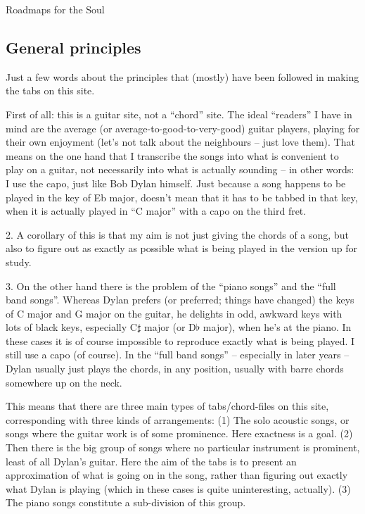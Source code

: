 
\thispagestyle{empty}
\label{roadmaps}

\vspace*{20ex}

\begin{articlelayout}
\begin{flushright}{\Huge Roadmaps for the Soul}\end{flushright}

\vspace{5ex}

\subsection*{General principles}

Just a few words about the principles that (mostly) have been followed
in making the tabs on this site.

First of all: this is a guitar site, not a ``{}chord''{} site. The
ideal ``{}readers''{} I have in mind are the average (or
average-to-good-to-very-good) guitar players, playing for their own
enjoyment (let's not talk about the neighbours -- just love
them). That means on the one hand that I transcribe the songs into
what is convenient to play on a guitar, not necessarily into what is
actually sounding -- in other words: I use the capo, just like Bob Dylan
himself. Just because a song happens to be played in the key of Eb
major, doesn't mean that it has to be tabbed in that key, when it is
actually played in ``{}C major''{} with a capo on the third fret.

2. A corollary of this is that my aim is not just giving the chords of
a song, but also to figure out as exactly as possible what is being
played in the version up for study.

3. On the other hand there is the problem of the ``{}piano songs''{}
and the ``{}full band songs''{}. Whereas Dylan prefers (or preferred;
things have changed) the keys of C major and G major on the guitar, he
delights in odd, awkward keys with lots of black keys, especially
C$\sharp$ major (or D$\flat$ major), when he's at the piano. In these
cases it is of course impossible to reproduce exactly what is being
played. I still use a capo (of course). In the ``{}full band songs''{}
-- especially in later years -- Dylan usually just plays the chords,
in any position, usually with barre chords somewhere up on the neck.

This means that there are three main types of tabs/chord-files on this
site, corresponding with three kinds of arrangements: (1) The solo
acoustic songs, or songs where the guitar work is of some
prominence. Here exactness is a goal. (2) Then there is the big group
of songs where no particular instrument is prominent, least of all
Dylan's guitar. Here the aim of the tabs is to present an
approximation of what is going on in the song, rather than figuring
out exactly what Dylan is playing (which in these cases is quite
uninteresting, actually). (3) The piano songs constitute a
sub-division of this group.


\end{articlelayout}
